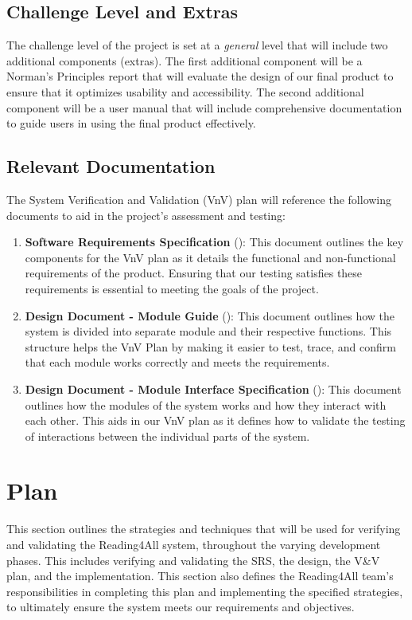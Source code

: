\documentclass[12pt, titlepage]{article}
\begin{document}
\subsection{Challenge Level and Extras}

The challenge level of the project is set at a \textit{general} level that will include two additional 
components (extras). The first additional component will be a Norman's Principles report that will 
evaluate the design of our final product to ensure that it optimizes usability and accessibility. The second additional 
component will be a user manual that will include comprehensive documentation to guide users in using the final 
product effectively. 

\subsection{Relevant Documentation}
The System Verification and Validation (VnV) plan will reference the following documents to aid in 
the project's assessment and testing:
\begin{enumerate}
  \item \textbf{Software Requirements Specification} (\citet{SRS}): This document outlines the key components 
for the VnV plan as it details the functional and non-functional requirements of the product. Ensuring that our testing 
satisfies these requirements is essential to meeting the goals of the project.
  \item \textbf{Design Document - Module Guide} (\citet{MG}): This document outlines how the system is divided into separate module and their respective functions. 
  This structure helps the VnV Plan by making it easier to test, trace, and confirm that each module works correctly and meets the requirements.
  \item \textbf{Design Document - Module Interface Specification} (\citet{MIS}): This document outlines how the modules of the system works and how they interact with each other.
  This aids in our VnV plan as it defines how to validate the testing of interactions between the individual parts of the system.
\end{enumerate}

\section{Plan}

This section outlines the strategies and techniques that will be used for verifying and validating the Reading4All system, throughout the varying development phases. 
This includes verifying and validating the SRS, the design, the V\&V plan, and the implementation. This section also defines the Reading4All team's responsibilities in 
completing this plan and implementing the specified strategies, to ultimately ensure the system meets our requirements and objectives.
\end{document}
